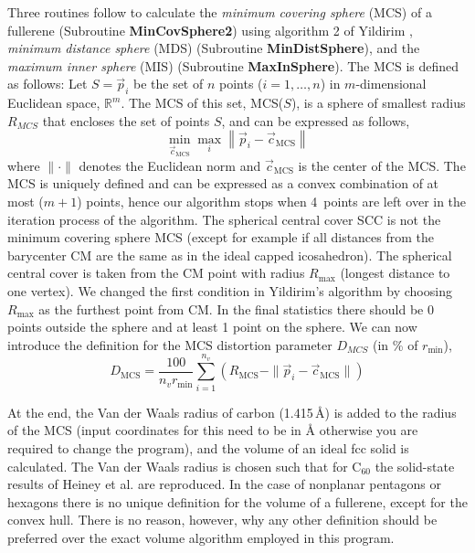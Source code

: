 \documentclass[article,a4paper,twoside]{memoir}
\newcommand{\C}[1]{\ensuremath{\mathrm{C}_{#1}}}
\newcommand{\funname}[1]{{\color{blue}\textbf{#1}}}
\begin{document}
Three routines follow to calculate the \textit{minimum covering sphere} (MCS) of a fullerene (Subroutine
\funname{MinCovSphere2}) using algorithm 2 of Yildirim \cite{Yildirim08}, \textit{minimum distance
sphere} (MDS) (Subroutine \funname{MinDistSphere}), and the \textit{maximum inner sphere} (MIS) (Subroutine \funname{MaxInSphere}).
The MCS is defined as follows:
Let $S = \vec{p}_i$ be the set of $n$ points ($i=1,\ldots ,n$) in $m$-dimensional Euclidean space, 
$\mathbb{R}^m$. The MCS of this set, MCS($S$), is a sphere of smallest radius $R_{MCS}$ that encloses the set of points $S$,
and can be expressed as follows,
\begin{equation}
	\label{eq:MCS}
	\min\limits_{\vec{c}_{\mathrm{MCS}} } \max\limits_i \left\| \vec{p}_i -\vec{c}_{\mathrm{MCS}} \right\|  
\end{equation} 
where $\|\cdot\| $ denotes the Euclidean norm and $\vec{c}_{\mathrm{MCS}}$ is the center of the MCS. The MCS
is uniquely defined and can be expressed as a convex combination of at most 
($m+1$) points, hence our algorithm stops when 4~points are left over in the iteration process of the algorithm.
The spherical central cover SCC is not the minimum covering sphere MCS
(except for example if all distances from the barycenter CM are the same as in the
ideal capped icosahedron). The spherical central cover is taken from the
CM point with radius $R_{\mathrm{max}}$ (longest distance to one vertex).  We changed the first
condition in Yildirim's algorithm by choosing $R_{\mathrm{max}}$ as the furthest point from CM.
In the final statistics there should be 0 points outside the sphere and at least 1 point on the sphere.
We can now introduce the definition for the MCS distortion parameter $D_{MCS}$ (in \% of $r_{\mathrm{min}}$),
\begin{equation} \label{eq:DMCS}
D_{\mathrm{MCS}} =\frac{100}{n_vr_\mathrm{min}} \sum_{i=1}^{n_v} \left(R_{\mathrm{MCS}} - \|\vec{p}_i - \vec{c}_{\mathrm{MCS}}\|\right)
\end{equation} 

At the end, the Van der Waals radius of carbon (1.415\,\AA) is added to the radius of the MCS
(input coordinates for this need to be in \AA{} otherwise you are required to change the program),
and the volume of an ideal fcc solid is calculated. The Van der Waals radius is chosen such that
for \C{60} the solid-state results of Heiney et al. \cite{Heiney91} are reproduced.
In the case of nonplanar pentagons or hexagons there is no unique definition for the volume of a fullerene,
except for the convex hull. There is no reason, however, why any other definition should be preferred
over the exact volume algorithm employed in this program.
\end{document}
